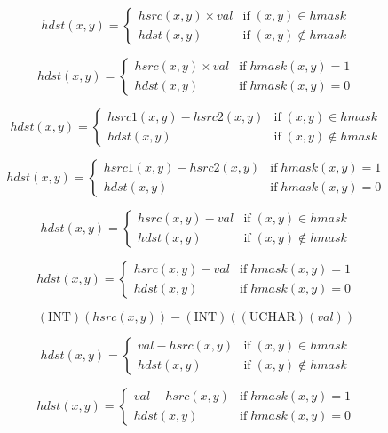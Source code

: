 \documentclass{article}
\begin{document}
{\[ hdst(x,y) = \left\{ \begin{array}{ll} hsrc(x,y) \times val & \mathrm{if} \; (x,y) \in hmask \\ hdst(x,y) & \mathrm{if} \; (x,y) \notin hmask \end{array} \right. \]
\pagebreak

\[hdst(x,y) = \left\{ \begin{array}{ll} hsrc(x,y) \times val & \mathrm{if} \; hmask(x,y) = 1 \\ hdst(x,y) & \mathrm{if} \; hmask(x,y) = 0 \end{array} \right. \]
\pagebreak

\[ hdst(x,y) = \left\{ \begin{array}{ll} hsrc1(x,y) - hsrc2(x,y) & \mathrm{if} \; (x,y) \in hmask \\ hdst(x,y) & \mathrm{if} \; (x,y) \notin hmask \end{array} \right. \]
\pagebreak

\[hdst(x,y) = \left\{ \begin{array}{ll} hsrc1(x,y) - hsrc2(x,y) & \mathrm{if} \; hmask(x,y) = 1 \\ hdst(x,y) & \mathrm{if} \; hmask(x,y) = 0 \end{array} \right. \]
\pagebreak

\[ hdst(x,y) = \left\{ \begin{array}{ll} hsrc(x,y) - val & \mathrm{if} \; (x,y) \in hmask \\ hdst(x,y) & \mathrm{if} \; (x,y) \notin hmask \end{array} \right. \]
\pagebreak

\[hdst(x,y) = \left\{ \begin{array}{ll} hsrc(x,y) - val & \mathrm{if} \; hmask(x,y) = 1 \\ hdst(x,y) & \mathrm{if} \; hmask(x,y) = 0 \end{array} \right. \]
\pagebreak

\[ ( \mathrm{INT} )(hsrc(x, y)) - ( \mathrm{INT} )( ( \mathrm{UCHAR} )( val ) ) \]
\pagebreak

\[ hdst(x,y) = \left\{ \begin{array}{ll} val - hsrc(x,y) & \mathrm{if} \; (x,y) \in hmask \\ hdst(x,y) & \mathrm{if} \; (x,y) \notin hmask \end{array} \right. \]
\pagebreak

\[hdst(x,y) = \left\{ \begin{array}{ll} val - hsrc(x,y) & \mathrm{if} \; hmask(x,y) = 1 \\ hdst(x,y) & \mathrm{if} \; hmask(x,y) = 0 \end{array} \right. \]
\pagebreak

}
\end{document}
